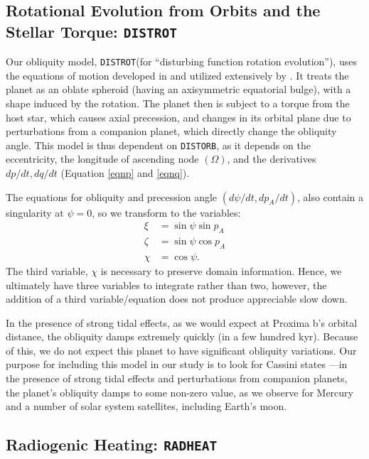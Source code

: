 \documentclass[preprint,12pt]{aastex}
\def\distorb{\texttt{\footnotesize{DISTORB}}}
\def\distrot{\texttt{\footnotesize{DISTROT}}}
\def\radheat{\texttt{\footnotesize{RADHEAT}}}
\begin{document}
\subsection{Rotational Evolution from Orbits and the Stellar Torque: \distrot}
Our obliquity model, \distrot (for ``disturbing function rotation evolution''), uses the equations of motion developed in \cite{Kinoshita1975, Kinoshita1977} and utilized extensively by \cite{Laskar1986,Laskar1993a,Laskar1993b,Armstrong14}. It treats the planet as an oblate spheroid (having an axisymmetric equatorial bulge), with a shape induced by the rotation. The planet then is subject to a torque from the host star, which causes axial precession, and changes in its orbital plane due to perturbations from a companion planet, which directly change the obliquity angle. This model is thus dependent on \distorb, as it depends on the eccentricity, the longitude of ascending node $(\Omega)$, and the derivatives $dp/dt, dq/dt$ (Equation \ref{eqnp} and \ref{eqnq}).

The equations for obliquity and precession angle $(d\psi/dt, dp_A/dt)$, also contain a singularity at $\psi = 0$, so we transform to the variables:
\begin{align}
\xi & = \sin{\psi} \sin{p_A} \\
\zeta & = \sin{\psi} \cos{p_A} \\
\chi & = \cos{\psi}.
\end{align}
The third variable, $\chi$ is necessary to preserve domain information. Hence, we ultimately have three variables to integrate rather than two, however, the addition of a third variable/equation does not produce appreciable slow down.

In the presence of strong tidal effects, as we would expect at Proxima b's orbital distance, the obliquity damps extremely quickly (in a few hundred kyr). Because of this, we do not expect this planet to have significant obliquity variations. Our purpose for including this model in our study is to look for Cassini states \citep{Colombo1966}---in the presence of strong tidal effects and perturbations from companion planets, the planet's obliquity damps to some non-zero value, as we observe for Mercury and a number of solar system satellites, including Earth's moon.

\subsection{Radiogenic Heating: \radheat}
\end{document}

